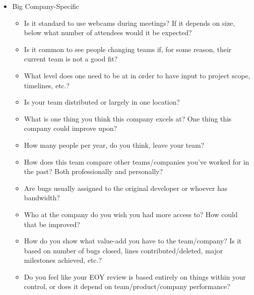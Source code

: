 \documentclass{article}
\begin{document}
\begin{itemize}
\begin{itemize}
	      \end{itemize}
	\item Big Company-Specific
	      \begin{itemize}
		      \item Is it standard to use webcams during meetings? If it depends on size, below what number of attendees would it be expected?
		      \item Is it common to see people changing teams if, for some reason, their current team is not a good fit?
		      \item What level does one need to be at in order to have input to project scope, timelines, etc.?
		      \item Is your team distributed or largely in one location?
		      \item What is one thing you think this company excels at? One thing this company could improve upon?
		      \item How many people per year, do you think, leave your team?
		      \item How does this team compare other teams/companies you've worked for in the past? Both professionally and personally?
		      \item Are bugs usually assigned to the original developer or whoever has bandwidth?
		      \item Who at the company do you wish you had more access to? How could that be improved?
		      \item How do you show what value-add you have to the team/company? Is it based on number of bugs closed, lines contributed/deleted, major milestones achieved, etc.?
		      \item Do you feel like your EOY review is based entirely on things within your control, or does it depend on team/product/company performance?
	      \end{itemize}
\end{itemize}
\end{document}
